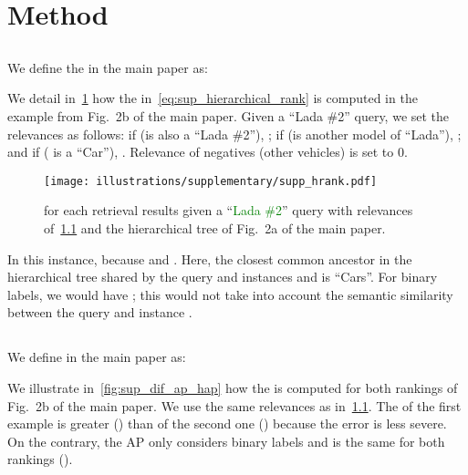 \setcounter{section}{0}
\renewcommand\thesection{\Alph{section}}


\section{Method}

\subsection{}\label{sec:sup_hrank}


We define the  in the main paper as:




We detail in~\cref{fig:supp_hrank_figure} how the  in~\cref{eq:sup_hierarchical_rank} is computed in the example from Fig.~2b of the main paper. Given a ``Lada \#2'' query, we set the relevances as follows: if  (\ie  is also a ``Lada \#2''), ; if  (\ie  is another model of ``Lada''), ; and if  ( is a ``Car''), . Relevance of negatives (other vehicles) is set to 0.


\begin{figure}
    \centering
    \texttt{[image: illustrations/supplementary/supp\_hrank.pdf]}
    \caption{ for each retrieval results given a ``\textcolor{Green}{Lada \#2}'' \textcolor{amethyst}{query} with relevances of~\cref{sec:sup_hrank} and the hierarchical tree of Fig.~2a of the main paper.}
    \label{fig:supp_hrank_figure}
\end{figure}


In this instance,  because  and . Here, the closest common ancestor in the hierarchical tree shared by the query and instances  and  is ``Cars''. For binary labels, we would have ; this would not take into account the semantic similarity between the query and instance .


\subsection{}

We define  in the main paper as:




We illustrate in~\cref{fig:sup_dif_ap_hap} how the  is computed for both rankings of Fig.~2b of the main paper. We use the same relevances as in~\cref{sec:sup_hrank}. The  of the first example is greater () than of the second one () because the error is less severe. On the contrary, the AP only considers binary labels and is the same for both rankings ().




